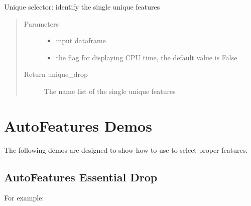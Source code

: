 \documentclass[letterpaper,11pt,english]{sphinxmanual}
\begin{document}
\begin{fulllineitems}
\begin{fulllineitems}
\end{fulllineitems}


\begin{fulllineitems}
\label{\detokenize{auto_feature:AutoFeatures.AutoFeatures.unique_selector}}
Unique selector: identify the single unique features
\begin{quote}\begin{description}
\item[{Parameters}] \leavevmode\begin{itemize}
\item {} 
 \textendash{} input dataframe

\item {} 
 \textendash{} the flag for displaying CPU time, the default value is False

\end{itemize}

\item[{Return unique\_drop}] \leavevmode
The name list of the single unique features

\end{description}\end{quote}

\end{fulllineitems}


\end{fulllineitems}



\section{AutoFeatures Demos}
\label{\detokenize{demo:autofeatures-demos}}\label{\detokenize{demo:demo}}\label{\detokenize{demo::doc}}
The following demos are designed to show how to use  to select proper features.


\subsection{AutoFeatures Essential Drop}
\label{\detokenize{demo:autofeatures-essential-drop}}
For example:
\end{document}

